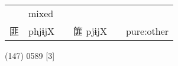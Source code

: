 \documentclass[14pt,a4paper]{scrartcl}
\begin{document}
\begin{longtable}[c]{@{}llllll@{}}
\begin{minipage}[t]{0.14\columnwidth}\raggedright\strut
\strut\end{minipage} &
\begin{minipage}[t]{0.14\columnwidth}\raggedright\strut
mixed
\strut\end{minipage}\tabularnewline
\begin{minipage}[t]{0.14\columnwidth}\raggedright\strut
匪
\strut\end{minipage} &
\begin{minipage}[t]{0.14\columnwidth}\raggedright\strut
phjɨjX
\strut\end{minipage} &
\begin{minipage}[t]{0.14\columnwidth}\raggedright\strut
\strut\end{minipage} &
\begin{minipage}[t]{0.14\columnwidth}\raggedright\strut
篚 pjɨjX
\strut\end{minipage} &
\begin{minipage}[t]{0.14\columnwidth}\raggedright\strut
\strut\end{minipage} &
\begin{minipage}[t]{0.14\columnwidth}\raggedright\strut
pure:other
\strut\end{minipage}\tabularnewline
\bottomrule
\end{longtable}

(147) 0589 {[}3{]}
\end{document}
